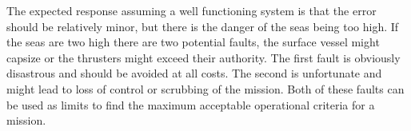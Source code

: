 \documentclass[class=article, crop=false]{standalone}
\begin{document}
The expected response assuming a well functioning system is that the error should be relatively minor, but there is the danger of the seas being too high. If the seas are two high there are two potential faults, the surface vessel might capsize or the thrusters might exceed their authority. The first fault is obviously disastrous and should be avoided at all costs. The second is unfortunate and might lead to loss of control or scrubbing of the mission. Both of these faults can be used as limits to find the maximum acceptable operational criteria for a mission.
\end{document}
